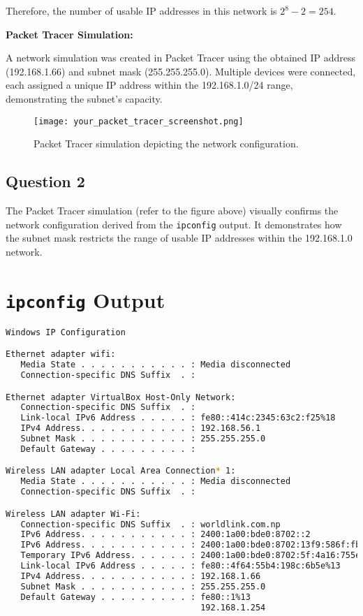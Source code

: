 \documentclass[12pt]{article}
\begin{document}
Therefore, the number of usable IP addresses in this network is $2^8 - 2 = \boxed{254}$.

\textbf{Packet Tracer Simulation:}

A network simulation was created in Packet Tracer using the obtained IP address (192.168.1.66) and subnet mask (255.255.255.0). Multiple devices were connected, each assigned a unique IP address within the 192.168.1.0/24 range, demonstrating the subnet's capacity.

\begin{figure}[H]
    \centering
    \texttt{[image: your\_packet\_tracer\_screenshot.png]}
    \caption{Packet Tracer simulation depicting the network configuration.}
\end{figure}

\subsection*{Question 2}
The Packet Tracer simulation (refer to the figure above) visually confirms the network configuration derived from the \texttt{ipconfig} output. It demonstrates how the subnet mask restricts the range of usable IP addresses within the 192.168.1.0 network.

\section{\texttt{ipconfig} Output}

\begin{lstlisting}[language=bash]
Windows IP Configuration

Ethernet adapter wifi:
   Media State . . . . . . . . . . . : Media disconnected
   Connection-specific DNS Suffix  . :

Ethernet adapter VirtualBox Host-Only Network:
   Connection-specific DNS Suffix  . :
   Link-local IPv6 Address . . . . . : fe80::414c:2345:63c2:f25%18
   IPv4 Address. . . . . . . . . . . : 192.168.56.1
   Subnet Mask . . . . . . . . . . . : 255.255.255.0
   Default Gateway . . . . . . . . . :

Wireless LAN adapter Local Area Connection* 1:
   Media State . . . . . . . . . . . : Media disconnected
   Connection-specific DNS Suffix  . :

Wireless LAN adapter Wi-Fi:
   Connection-specific DNS Suffix  . : worldlink.com.np
   IPv6 Address. . . . . . . . . . . : 2400:1a00:bde0:8702::2
   IPv6 Address. . . . . . . . . . . : 2400:1a00:bde0:8702:13f9:586f:fb22:386e
   Temporary IPv6 Address. . . . . . : 2400:1a00:bde0:8702:5f:4a16:755e:4aef
   Link-local IPv6 Address . . . . . : fe80::4f64:55b4:198c:6b5e%13
   IPv4 Address. . . . . . . . . . . : 192.168.1.66
   Subnet Mask . . . . . . . . . . . : 255.255.255.0
   Default Gateway . . . . . . . . . : fe80::1%13
                                       192.168.1.254
\end{lstlisting}
\end{document}
